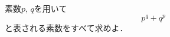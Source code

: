 \documentclass[../../main.tex]{subfiles}
\begin{document}
素数$p, \, q$を用いて
\[ p^q+q^p \]
と表される素数をすべて求めよ．
\end{document}
